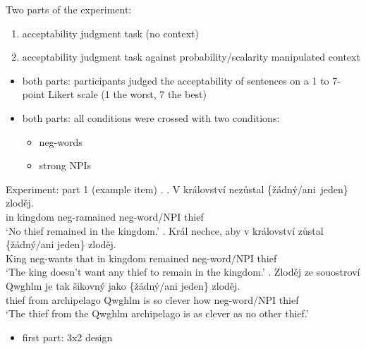 \documentclass[
  ignorenonframetext,
]{beamer}
\providecommand{\tightlist}{%
  \setlength{\itemsep}{0pt}\setlength{\parskip}{0pt}}
\begin{document}
\begin{frame}
Two parts of the experiment:

\begin{enumerate}
\item
  acceptability judgment task (no context)
\item
  acceptability judgment task against probability/scalarity manipulated
  context
\end{enumerate}

\begin{itemize}
\item
  both parts: participants judged the acceptability of sentences on a 1
  to 7-point Likert scale (1 the worst, 7 the best)
\item
  both parts: all conditions were crossed with two conditions:

  \begin{itemize}
  \tightlist
  \item
    neg-words
  \item
    strong NPIs
  \end{itemize}
\end{itemize}
\end{frame}

\begin{frame}
\begin{block}{Experiment: part 1 (example item)}
\protect\hypertarget{experiment-part-1-example-item}{}
\ex. \ag. V království nezůstal \{žádný/ani~jeden\} zloděj.\\
in kingdom neg-ramained neg-word/NPI thief\\
`No thief remained in the kingdom.' \bg. Král nechce, aby v království
zůstal \{žádný/ani jeden\} zloděj.\\
King neg-wants that in kingdom remained neg-word/NPI thief\\
`The king doesn't want any thief to remain in the kingdom.' \cg. Zloděj
ze souostroví Qwghlm je tak šikovný jako \{žádný/ani jeden\} zloděj.\\
thief from archipelago Qwghlm is so clever how neg-word/NPI thief\\
`The thief from the Qwghlm archipelago is as clever as no other thief.'

\begin{itemize}
\tightlist
\item
  first part: 3x2 design
\end{itemize}
\end{block}
\end{frame}
\end{document}
